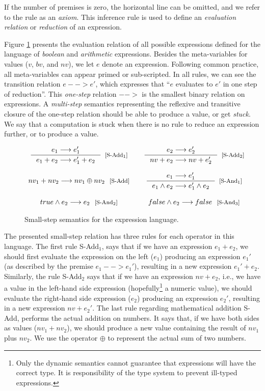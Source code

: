 \documentclass[tese,capa,english]{texufpel}
\begin{document}
If the number of premises is zero, the horizontal line can be omitted, and we refer to the rule as an \emph{axiom}. This inference rule is used to define an \emph{evaluation relation} or \emph{reduction} of an expression.

Figure \ref{fig:smallexp} presents the evaluation relation of all possible expressions defined for the language of \emph{boolean} and \emph{arithmetic} expressions. Besides the meta-variables for values ($v$, $bv$, and $nv$), we let $e$ denote an expression. Following common practice, all meta-variables can appear primed or sub-scripted. In all rules, we can see the transition relation $e --> e'$, which expresses that ``$e$ evaluates to $e'$ in one step of reduction''. This \emph{one-step} relation $-->$ is the smallest binary relation on expressions. A \emph{multi-step} semantics representing the reflexive and transitive closure of the one-step relation should be able to produce a value, or get \emph{stuck}. We say that a computation is stuck when there is no rule to reduce an expression further, or to produce a value. 

\begin{figure}[!htb]
\[
\begin{array}{ccc}    
  \inference{e_1 --> e_1'}
            {e_1 + e_2 --> e_1' + e_2}[\textrm{[S-Add$_1$]}]
& &
  \inference{e_2 --> e_2'}
            {nv + e_2 --> nv + e_2'}[\textrm{[S-Add$_2$]}]
\\ \\
  nv_1 + nv_2 --> nv_1 \oplus nv_2 \ \ \footnotesize\textrm{[S-Add]}
& &  
  \inference{e_1 --> e_1'}
            {e_1 \wedge e_2 --> e_1' \wedge e_2}[\textrm{[S-And$_1$]}]
\\ \\
  true \wedge e_2 --> e_2 \ \ \footnotesize\textrm{[S-And$_2$]}
& &
  false \wedge e_2 --> false \ \ \footnotesize\textrm{[S-And$_3$]}
\end{array}    
\] 
\caption{Small-step semantics for the expression language.}
\label{fig:smallexp}
\end{figure}

The presented small-step relation has three rules for each operator in this language. The first rule {\footnotesize S-Add$_1$}, says that if we have an expression $e_1 + e_2$, we should first evaluate the expression on the left ($e_1$) producing an expression $e_1'$ (as described by the premise $e_1 --> e_1'$), resulting in a new expression $e_1' + e_2$. Similarly, the rule {\footnotesize S-Add$_2$} says that if we have an expression $nv + e_2$, i.e., we have a value in the left-hand side expression (hopefully\footnote{Only the dynamic semantics cannot guarantee that expressions will have the correct type. It is responsibility of the type system to prevent ill-typed expressions.} a numeric value), we should evaluate the right-hand side expression ($e_2$) producing an expression $e_2'$, resulting in a new expression $nv + e_2'$. The last rule regarding mathematical addition {\footnotesize S-Add}, performs the actual addition on numbers. It says that, if we have both sides as values ($nv_1 + nv_2$), we should produce a new value containing the result of $nv_1$ plus $nv_2$. We use the operator $\oplus$ to represent the actual sum of two numbers.
\end{document}
